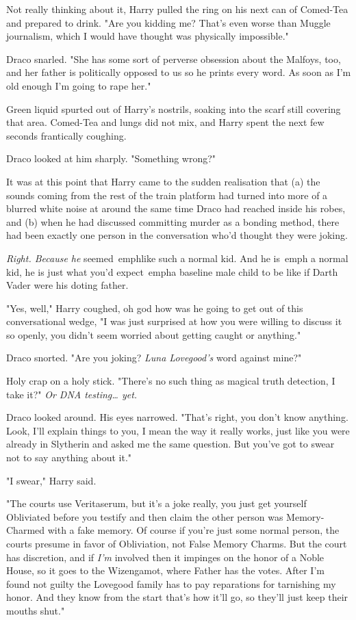 Not really thinking about it, Harry pulled the ring on his next can of 
Comed-Tea and prepared to drink. "Are you kidding me? That's even worse than 
Muggle journalism, which I would have thought was physically impossible."

Draco snarled. "She has some sort of perverse obsession about the Malfoys, too, 
and her father is politically opposed to us so he prints every word. As soon as 
I'm old enough I'm going to rape her."

Green liquid spurted out of Harry's nostrils, soaking into the scarf still 
covering that area. Comed-Tea and lungs did not mix, and Harry spent the next 
few seconds frantically coughing.

Draco looked at him sharply. "Something wrong?"

It was at this point that Harry came to the sudden realisation that (a) the 
sounds coming from the rest of the train platform had turned into more of a 
blurred white noise at around the same time Draco had reached inside his robes, 
and (b) when he had discussed committing murder as a bonding method, there had 
been exactly one person in the conversation who'd thought they were joking.

\emph{Right. Because he} seemed\ emph{like such a normal kid. And he} is\ emph{
a normal kid, he is just what you'd} expect\ emph{a baseline male child to be 
like if Darth Vader were his doting father.}

"Yes, well," Harry coughed, oh god how was he going to get out of this 
conversational wedge, "I was just surprised at how you were willing to discuss 
it so openly, you didn't seem worried about getting caught or anything."

Draco snorted. "Are you joking? \emph{Luna Lovegood's} word against mine?"

Holy crap on a holy stick. "There's no such thing as magical truth detection, I 
take it?" \emph{Or DNA testing{\ldots} yet.}

Draco looked around. His eyes narrowed. "That's right, you don't know anything. 
Look, I'll explain things to you, I mean the way it really works, just like you 
were already in Slytherin and asked me the same question. But you've got to 
swear not to say anything about it."

"I swear," Harry said.

"The courts use Veritaserum, but it's a joke really, you just get yourself 
Obliviated before you testify and then claim the other person was 
Memory-Charmed with a fake memory. Of course if you're just some normal person, 
the courts presume in favor of Obliviation, not False Memory Charms. But the 
court has discretion, and if \emph{I'm} involved then it impinges on the honor 
of a Noble House, so it goes to the Wizengamot, where Father has the votes. 
After I'm found not guilty the Lovegood family has to pay reparations for 
tarnishing my honor. And they know from the start that's how it'll go, so 
they'll just keep their mouths shut."

